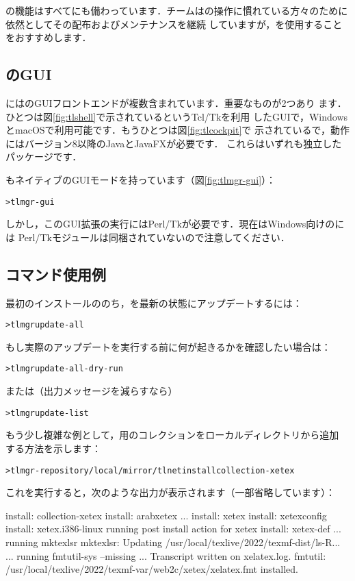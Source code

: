 \documentclass[uplatex,dvipdfmx,tombow]{jsarticle}
\begin{document}
の機能はすべてにも備わっています．\TL チームはの操作に慣れている方々のために依然としてその配布およびメンテナンスを継続
していますが，を使用することをおすすめします．

\subsection{のGUI}

\TL にはのGUIフロントエンドが複数含まれています．重要なものが2つあり
ます．ひとつは図\ref{fig:tlshell}で示されているというTcl/Tkを利用
したGUIで，WindowsとmacOSで利用可能です．もうひとつは図\ref{fig:tlcockpit}で
示されているで，動作にはバージョン8以降のJavaとJavaFXが必要です．
これらはいずれも独立したパッケージです．

もネイティブのGUIモードを持っています（図\ref{fig:tlmgr-gui}）：
%
\begin{alltt}
> tlmgr -gui
\end{alltt}
%
しかし，このGUI拡張の実行にはPerl/Tkが必要です．現在はWindows向けの\TL には
Perl/Tkモジュールは同梱されていないので注意してください．

\subsection{コマンド使用例}

最初のインストールののち，\TL を最新の状態にアップデートするには：
%
\begin{alltt}
> tlmgr update -all
\end{alltt}
%
もし実際のアップデートを実行する前に何が起きるかを確認したい場合は：
%
\begin{alltt}
> tlmgr update -all -dry-run
\end{alltt}
%
または（出力メッセージを減らすなら）
%
\begin{alltt}
> tlmgr update -list
\end{alltt}

もう少し複雑な例として，\XeTeX 用のコレクションをローカルディレクトリから追加
する方法を示します：
%
\begin{alltt}
> tlmgr -repository /local/mirror/tlnet install collection-xetex
\end{alltt}
%
これを実行すると，次のような出力が表示されます（一部省略しています）：
%
\begin{fverbatim}
install: collection-xetex
install: arabxetex
...
install: xetex
install: xetexconfig
install: xetex.i386-linux
running post install action for xetex
install: xetex-def
...
running mktexlsr
mktexlsr: Updating /usr/local/texlive/2022/texmf-dist/ls-R...
...
running fmtutil-sys --missing
...
Transcript written on xelatex.log.
fmtutil: /usr/local/texlive/2022/texmf-var/web2c/xetex/xelatex.fmt installed.
\end{fverbatim}
\end{document}
